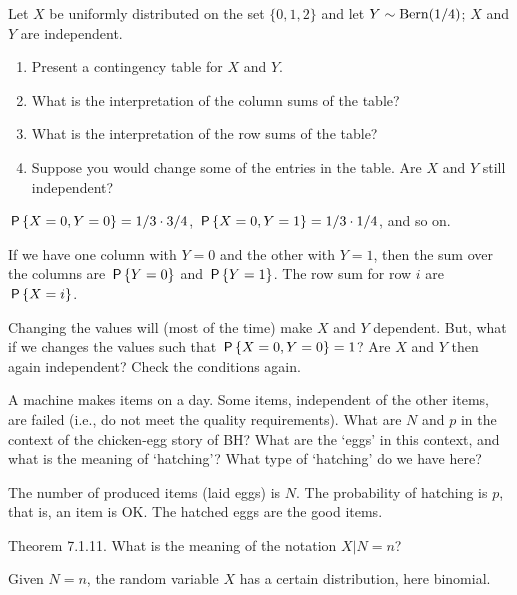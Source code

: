 \begin{exercise}
Let $X$ be uniformly distributed on the set $\{0,1,2\}$ and let $Y \sim \Bern{1/4}$; $X$ and $Y$ are independent.
\begin{enumerate}
\item Present a contingency table for $X$ and $Y$.
\item What is the interpretation of the column sums of the table?
\item What is the interpretation of the row sums of the table?
\item Suppose you would change some of the entries in the table. Are $X$ and $Y$ still independent?
\end{enumerate}
\begin{solution}
$\P{X=0, Y=0} = 1/3 \cdot 3/4$,
$\P{X=0, Y=1} = 1/3 \cdot 1/4$, and so on.

If we have one column with $Y=0$ and the other with $Y=1$, then the sum over the columns are $\P{Y=0}$ and $\P{Y=1}$. The row sum for row $i$ are  $\P{X=i}$.

Changing the values will (most of the time) make $X$ and $Y$ dependent. But, what if we changes the values such that  $\P{X=0, Y=0} =1$? Are $X$ and $Y$ then again independent? Check the conditions again.
\end{solution}
\end{exercise}


\begin{exercise}
A machine makes items on a day.
Some items, independent of the other items, are failed (i.e., do not meet the quality requirements).
What are $N$ and  $p$ in the context of the chicken-egg story of BH? What are the `eggs' in this context, and what is the meaning of `hatching'?
What type of `hatching' do we have here?
\begin{solution}
  The number of produced items (laid eggs) is $N$. The probability of hatching is $p$, that is, an item is OK. The hatched eggs are the good items.
\end{solution}
\end{exercise}



\begin{exercise}
Theorem 7.1.11. What is the meaning of the notation $X|N=n$?
\begin{solution}
  Given $N=n$, the random variable $X$ has a certain distribution, here binomial.
\end{solution}
\end{exercise}






